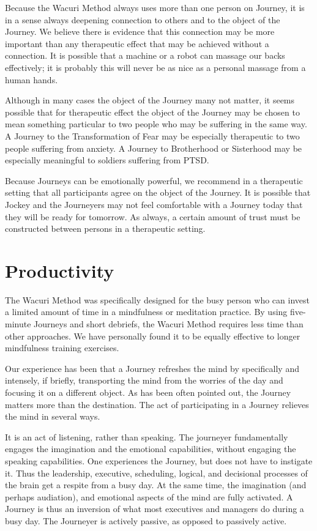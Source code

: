 \documentclass[12pt]{book}
\begin{document}
Because the Wacuri Method always uses more than one person on Journey,
it is in a sense always deepening connection to others and to the
object of the Journey. We believe there is evidence that this
connection may be more important than any therapeutic effect that may
be achieved without a connection. It is possible that a machine or a
robot can massage our backs effectively; it is probably this will
never be as nice as a personal massage from a human hands.

Although in many cases the object of the Journey many not matter, it
seems possible that for therapeutic effect the object of the Journey
may be chosen to mean something particular to two people who may be
suffering in the same way. A Journey to the Transformation of Fear may
be especially therapeutic to two people suffering from anxiety. A
Journey to Brotherhood or Sisterhood may be especially meaningful to
soldiers suffering from PTSD.

Because Journeys can be emotionally powerful, we recommend in a
therapeutic setting that all participants agree on the object of the
Journey. It is possible that Jockey and the Journeyers may not feel
comfortable with a Journey today that they will be ready for
tomorrow. As always, a certain amount of trust must be constructed
between persons in a therapeutic setting.

\section{Productivity}

The Wacuri Method was specifically designed for the busy person who
can invest a limited amount of time in a mindfulness or meditation
practice. By using five-minute Journeys and short debriefs, the Wacuri
Method requires less time than other approaches. We have personally
found it to be equally effective to longer mindfulness training
exercises.

Our experience has been that a Journey refreshes the mind by
specifically and intensely, if briefly, transporting the mind from the
worries of the day and focusing it on a different object. As has been
often pointed out, the Journey matters more than the destination. The
act of participating in a Journey relieves the mind in several ways.

It is an act of listening, rather than speaking. The journeyer
fundamentally engages the imagination and the emotional capabilities,
without engaging the speaking capabilities. One experiences the
Journey, but does not have to instigate it.  Thus the leadership,
executive, scheduling, logical, and decisional processes of the brain get a respite
from a busy day. At the same time, the imagination (and perhaps
audiation), and emotional aspects of the mind are fully activated. A
Journey is thus an inversion of what most executives and managers do
during a busy day. The Journeyer is actively passive, as opposed to passively active.
\end{document}
